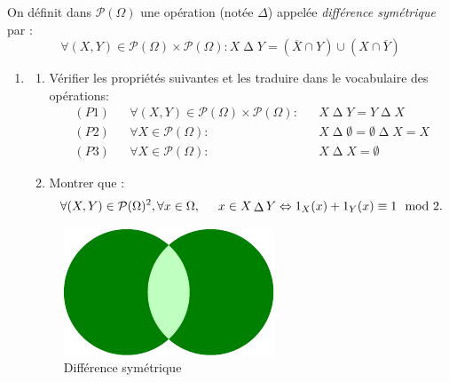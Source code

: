 On définit dans $\mathcal P(\Omega)$ une opération (notée $\Delta$) appelée \emph{différence symétrique} par :
\begin{displaymath}
 \forall (X,Y)\in \mathcal P(\Omega)\times \mathcal P(\Omega) :
X \mathop{\Delta} Y = (\overline{X}\cap Y)\cup(X \cap \overline{Y})
\end{displaymath}
\begin{enumerate}
 \item \begin{enumerate}
 \item Vérifier les propriétés suivantes et les traduire dans le vocabulaire des opérations:
\begin{align*}
(P1)& &\forall (X,Y)\in \mathcal P(\Omega)\times \mathcal P(\Omega) :& &X \mathop{\Delta} Y = Y \mathop{\Delta} X \\
(P2)& &\forall X \in \mathcal P(\Omega) :& &X \mathop{\Delta} \emptyset = \emptyset \mathop{\Delta} X = X\\
(P3)& &\forall X \in \mathcal P(\Omega) :& &X \mathop{\Delta} X = \emptyset 
\end{align*}
\item Montrer que :
\begin{displaymath}
\forall (X,Y)\in \mathcal P(\Omega)^2, \forall x\in \Omega,\hspace{0.5cm} x \in X \mathop{\Delta} Y \Leftrightarrow 1_X(x) + 1_Y(x) \equiv 1 \mod 2.  
\end{displaymath}

\end{enumerate}

\begin{figure}[ht]
 \centering
 \includegraphics{./Ehamm_1.pdf}
 \caption{Différence symétrique}
 \label{fig:Ehamm_1}
\end{figure}


\end{enumerate}
